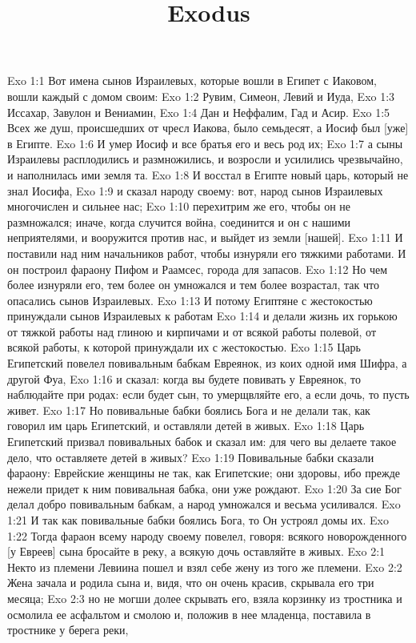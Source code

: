 

\title{Exodus}

Exo 1:1  Вот имена сынов Израилевых, которые вошли в Египет с Иаковом, вошли каждый с домом своим:
Exo 1:2  Рувим, Симеон, Левий и Иуда,
Exo 1:3  Иссахар, Завулон и Вениамин,
Exo 1:4  Дан и Неффалим, Гад и Асир.
Exo 1:5  Всех же душ, происшедших от чресл Иакова, было семьдесят, а Иосиф был [уже] в Египте.
Exo 1:6  И умер Иосиф и все братья его и весь род их;
Exo 1:7  а сыны Израилевы расплодились и размножились, и возросли и усилились чрезвычайно, и наполнилась ими земля та.
Exo 1:8  И восстал в Египте новый царь, который не знал Иосифа,
Exo 1:9  и сказал народу своему: вот, народ сынов Израилевых многочислен и сильнее нас;
Exo 1:10  перехитрим же его, чтобы он не размножался; иначе, когда случится война, соединится и он с нашими неприятелями, и вооружится против нас, и выйдет из земли [нашей].
Exo 1:11  И поставили над ним начальников работ, чтобы изнуряли его тяжкими работами. И он построил фараону Пифом и Раамсес, города для запасов.
Exo 1:12  Но чем более изнуряли его, тем более он умножался и тем более возрастал, так что опасались сынов Израилевых.
Exo 1:13  И потому Египтяне с жестокостью принуждали сынов Израилевых к работам
Exo 1:14  и делали жизнь их горькою от тяжкой работы над глиною и кирпичами и от всякой работы полевой, от всякой работы, к которой принуждали их с жестокостью.
Exo 1:15  Царь Египетский повелел повивальным бабкам Евреянок, из коих одной имя Шифра, а другой Фуа,
Exo 1:16  и сказал: когда вы будете повивать у Евреянок, то наблюдайте при родах: если будет сын, то умерщвляйте его, а если дочь, то пусть живет.
Exo 1:17  Но повивальные бабки боялись Бога и не делали так, как говорил им царь Египетский, и оставляли детей в живых.
Exo 1:18  Царь Египетский призвал повивальных бабок и сказал им: для чего вы делаете такое дело, что оставляете детей в живых?
Exo 1:19  Повивальные бабки сказали фараону: Еврейские женщины не так, как Египетские; они здоровы, ибо прежде нежели придет к ним повивальная бабка, они уже рождают.
Exo 1:20  За сие Бог делал добро повивальным бабкам, а народ умножался и весьма усиливался.
Exo 1:21  И так как повивальные бабки боялись Бога, то Он устроял домы их.
Exo 1:22  Тогда фараон всему народу своему повелел, говоря: всякого новорожденного [у Евреев] сына бросайте в реку, а всякую дочь оставляйте в живых.
Exo 2:1  Некто из племени Левиина пошел и взял себе жену из того же племени.
Exo 2:2  Жена зачала и родила сына и, видя, что он очень красив, скрывала его три месяца;
Exo 2:3  но не могши долее скрывать его, взяла корзинку из тростника и осмолила ее асфальтом и смолою и, положив в нее младенца, поставила в тростнике у берега реки,
